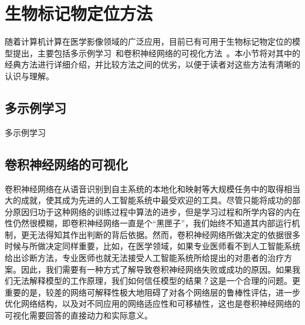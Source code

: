 \section{生物标记物定位方法}
随着计算机计算在医学影像领域的广泛应用，目前已有可用于生物标记物定位的模型提出，主要包括多示例学习~\cite{maron1998framework}和卷积神经网络的可视化方法~\cite{zhou2016learning, selvaraju2017grad}。本小节将对其中的经典方法进行详细介绍，并比较方法之间的优劣，以便于读者对这些方法有清晰的认识与理解。
\subsection{多示例学习}
多示例学习~\cite{maron1998framework}
\subsection{卷积神经网络的可视化}\label{subsec:visulization_methods}
卷积神经网络在从语音识别到自主系统的本地化和映射等大规模任务中的取得相当大的成就，使其成为先进的人工智能系统中最受欢迎的工具。尽管只能将成功的部分原因归功于这种网络的训练过程中算法的进步，但是学习过程和所学内容的内在性仍然很模糊，即卷积神经网络一直是个“黑匣子”，我们始终不知道其内部运行机制，更无法得知其作出判断的背后依据。然而，卷积神经网络所做决定的依据很多时候与所做决定同样重要，比如，在医学领域，如果专业医师看不到人工智能系统给出诊断方法，专业医师也就无法接受人工智能系统所给提出的对患者的治疗方案。因此，我们需要有一种方式了解导致卷积神经网络失败或成功的原因。如果我们无法解释模型的工作原理，我们如何信任模型的结果？这是一个合理的问题。更重要的是，较差的网络可解释性极大地阻碍了对各个网络层的鲁棒性评估，进一步优化网络结构，以及对不同应用的网络适应性和可移植性，这也是卷积神经网络的可视化需要回答的直接动力和实际意义。

